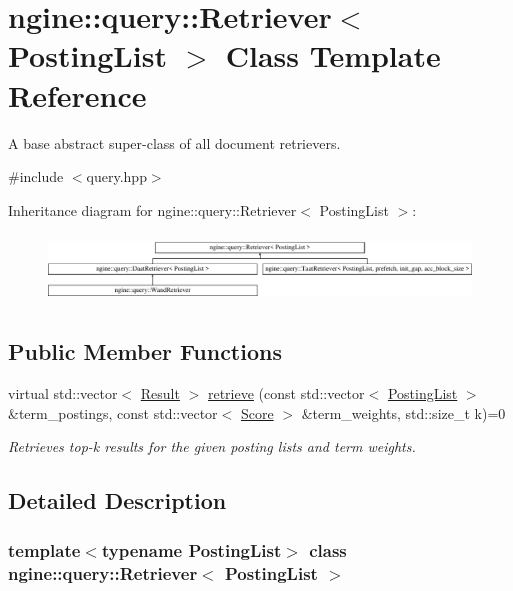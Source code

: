 \hypertarget{classngine_1_1query_1_1Retriever}{}\section{ngine\+:\+:query\+:\+:Retriever$<$ Posting\+List $>$ Class Template Reference}
\label{classngine_1_1query_1_1Retriever}


A base abstract super-\/class of all document retrievers.  




{\ttfamily \#include $<$query.\+hpp$>$}

Inheritance diagram for ngine\+:\+:query\+:\+:Retriever$<$ Posting\+List $>$\+:\begin{figure}[H]
\begin{center}
\leavevmode
\includegraphics[height=1.826087cm]{classngine_1_1query_1_1Retriever}
\end{center}
\end{figure}
\subsection*{Public Member Functions}
\begin{DoxyCompactItemize}
\item 
virtual std\+::vector$<$ \hyperlink{structngine_1_1query_1_1Result}{Result} $>$ \hyperlink{classngine_1_1query_1_1Retriever_ac5549667cbb5927ec4ead8b9ec8aece0}{retrieve} (const std\+::vector$<$ \hyperlink{classngine_1_1PostingList}{Posting\+List} $>$ \&term\+\_\+postings, const std\+::vector$<$ \hyperlink{structngine_1_1Score}{Score} $>$ \&term\+\_\+weights, std\+::size\+\_\+t k)=0
\begin{DoxyCompactList}\small\item\em Retrieves top-\/k results for the given posting lists and term weights. \end{DoxyCompactList}\end{DoxyCompactItemize}


\subsection{Detailed Description}
\subsubsection*{template$<$typename Posting\+List$>$\newline
class ngine\+::query\+::\+Retriever$<$ Posting\+List $>$}

